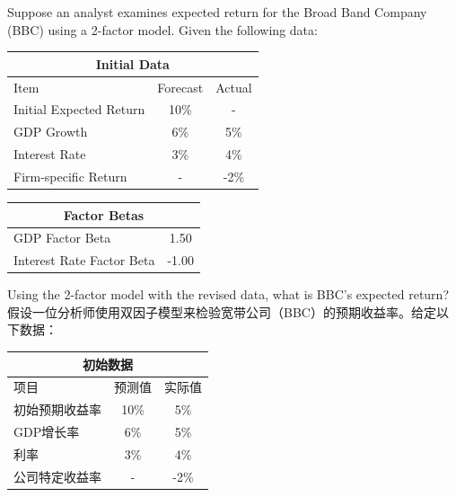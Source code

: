 \documentclass{article}
\newcounter{question} %
\begin{document}
\begin{question}
    Suppose an analyst examines expected return for the Broad Band Company (BBC) using a 2-factor model. Given the following data:

    \begin{center}
        \begin{tabular}{|l|c|c|}
            \hline
            \multicolumn{3}{|c|}{Initial Data} \\
            \hline
            Item & Forecast & Actual \\ \hline
            Initial Expected Return & 10\% & - \\ \hline
            GDP Growth & 6\% & 5\% \\ \hline
            Interest Rate & 3\% & 4\% \\ \hline
            Firm-specific Return & - & -2\% \\ \hline
        \end{tabular}
    \end{center}

    \begin{center}
        \begin{tabular}{|l|c|}
            \hline
            \multicolumn{2}{|c|}{Factor Betas} \\
            \hline
            GDP Factor Beta & 1.50 \\ \hline
            Interest Rate Factor Beta & -1.00 \\ \hline
        \end{tabular}
    \end{center}

    Using the 2-factor model with the revised data, what is BBC's expected return?
    \\假设一位分析师使用双因子模型来检验宽带公司（BBC）的预期收益率。给定以下数据：

    \begin{center}
        \begin{tabular}{|l|c|c|}
            \hline
            \multicolumn{3}{|c|}{初始数据} \\
            \hline
            项目 & 预测值 & 实际值 \\ \hline
            初始预期收益率 & 10\% & 5\% \\ \hline
            GDP增长率 & 6\% & 5\% \\ \hline
            利率 & 3\% & 4\% \\ \hline
            公司特定收益率 & - & -2\% \\ \hline
        \end{tabular}
    \end{center}


\end{question}
\end{document}

